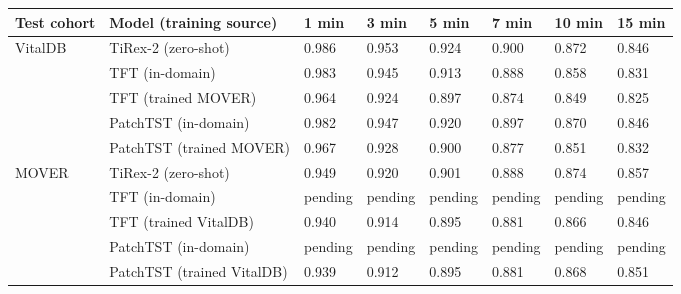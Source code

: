 \begin{tabular}{llllllll}
\hline
Test cohort & Model (training source) & 1 min & 3 min & 5 min & 7 min & 10 min & 15 min \\
\hline
VitalDB & TiRex-2 (zero-shot) & 0.986 & 0.953 & 0.924 & 0.900 & 0.872 & 0.846 \\
 & TFT (in-domain) & 0.983 & 0.945 & 0.913 & 0.888 & 0.858 & 0.831 \\
 & TFT (trained MOVER) & 0.964 & 0.924 & 0.897 & 0.874 & 0.849 & 0.825 \\
 & PatchTST (in-domain) & 0.982 & 0.947 & 0.920 & 0.897 & 0.870 & 0.846 \\
 & PatchTST (trained MOVER) & 0.967 & 0.928 & 0.900 & 0.877 & 0.851 & 0.832 \\
MOVER & TiRex-2 (zero-shot) & 0.949 & 0.920 & 0.901 & 0.888 & 0.874 & 0.857 \\
 & TFT (in-domain) & pending & pending & pending & pending & pending & pending \\
 & TFT (trained VitalDB) & 0.940 & 0.914 & 0.895 & 0.881 & 0.866 & 0.846 \\
 & PatchTST (in-domain) & pending & pending & pending & pending & pending & pending \\
 & PatchTST (trained VitalDB) & 0.939 & 0.912 & 0.895 & 0.881 & 0.868 & 0.851 \\
\hline
\end{tabular}
